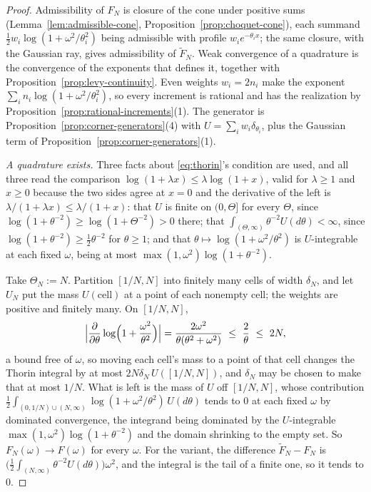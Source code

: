 \begin{proof}
Admissibility of $F_N$ is closure of the cone under positive sums
(Lemma~\ref{lem:admissible-cone}, Proposition~\ref{prop:choquet-cone}), each summand
$\tfrac12 w_i\log(1+\omega^2/\theta_i^2)$ being admissible with profile $w_ie^{-\theta_ix}$; the
same closure, with the Gaussian ray, gives admissibility of $\tilde F_N$. Weak
convergence of a quadrature is the convergence of the exponents that defines it, together with
Proposition~\ref{prop:levy-continuity}. Even weights $w_i = 2n_i$ make the exponent
$\sum_i n_i\log(1+\omega^2/\theta_i^2)$, so every increment is rational and has the
realization by Proposition~\ref{prop:rational-increments}(1). The generator is
Proposition~\ref{prop:corner-generators}(4) with $U = \sum_i w_i\delta_{\theta_i}$, plus the
Gaussian term of Proposition~\ref{prop:corner-generators}(1).

\emph{A quadrature exists.} Three facts about \ref{eq:thorin}'s condition are used, and all three
read the comparison $\log(1+\lambda x) \le \lambda\log(1+x)$, valid for $\lambda \ge 1$ and
$x \ge 0$ because the two sides agree at $x = 0$ and the derivative of the left is
$\lambda/(1+\lambda x) \le \lambda/(1+x)$: that $U$ is finite on $(0,\Theta]$ for every $\Theta$,
since $\log(1+\theta^{-2}) \ge \log(1+\Theta^{-2}) > 0$ there; that
$\int_{(\Theta,\infty)}\theta^{-2}U(d\theta) < \infty$, since
$\log(1+\theta^{-2}) \ge \tfrac12\theta^{-2}$ for $\theta \ge 1$; and that
$\theta \mapsto \log(1+\omega^2/\theta^2)$ is $U$-integrable at each fixed $\omega$, being at most
$\max(1,\omega^2)\log(1+\theta^{-2})$.

Take $\Theta_N := N$. Partition $[1/N,N]$ into finitely many cells of width $\delta_N$, and let
$U_N$ put the mass $U(\text{cell})$ at a point of each nonempty cell; the weights are positive and
finitely many. On $[1/N,N]$,
\[
  \Bigl|\frac{\partial}{\partial\theta}\log\Bigl(1 + \frac{\omega^2}{\theta^2}\Bigr)\Bigr|
   = \frac{2\omega^2}{\theta(\theta^2+\omega^2)} \ \le\ \frac 2\theta \ \le\ 2N ,
\]
a bound free of $\omega$, so moving each cell's mass to a point of that cell changes the Thorin
integral by at most $2N\delta_N\,U([1/N,N])$, and $\delta_N$ may be chosen to make that at most
$1/N$. What is left is the mass of $U$ off $[1/N,N]$, whose contribution
$\tfrac12\int_{(0,1/N)\cup(N,\infty)}\log(1+\omega^2/\theta^2)\,U(d\theta)$ tends to $0$ at each
fixed $\omega$ by dominated convergence, the integrand being dominated by the $U$-integrable
$\max(1,\omega^2)\log(1+\theta^{-2})$ and the domain shrinking to the empty set. So
$F_N(\omega) \to F(\omega)$ for every $\omega$. For the variant, the difference
$\tilde F_N - F_N$ is $\bigl(\tfrac12\int_{(N,\infty)}\theta^{-2}U(d\theta)\bigr)\omega^2$, and
the integral is the tail of a finite one, so it tends to $0$.
\end{proof}

